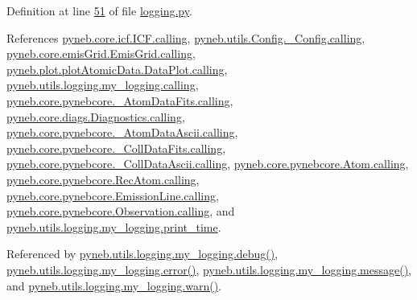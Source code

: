 Definition at line \hyperlink{logging_8py_source_l00051}{51} of file \hyperlink{logging_8py_source}{logging.\+py}.



References \hyperlink{icf_8py_source_l00016}{pyneb.\+core.\+icf.\+I\+C\+F.\+calling}, \hyperlink{_config_8py_source_l00032}{pyneb.\+utils.\+Config.\+\_\+\+Config.\+calling}, \hyperlink{emis_grid_8py_source_l00041}{pyneb.\+core.\+emis\+Grid.\+Emis\+Grid.\+calling}, \hyperlink{plot_atomic_data_8py_source_l00042}{pyneb.\+plot.\+plot\+Atomic\+Data.\+Data\+Plot.\+calling}, \hyperlink{logging_8py_source_l00044}{pyneb.\+utils.\+logging.\+my\+\_\+logging.\+calling}, \hyperlink{pynebcore_8py_source_l00090}{pyneb.\+core.\+pynebcore.\+\_\+\+Atom\+Data\+Fits.\+calling}, \hyperlink{diags_8py_source_l00169}{pyneb.\+core.\+diags.\+Diagnostics.\+calling}, \hyperlink{pynebcore_8py_source_l00311}{pyneb.\+core.\+pynebcore.\+\_\+\+Atom\+Data\+Ascii.\+calling}, \hyperlink{pynebcore_8py_source_l00568}{pyneb.\+core.\+pynebcore.\+\_\+\+Coll\+Data\+Fits.\+calling}, \hyperlink{pynebcore_8py_source_l00918}{pyneb.\+core.\+pynebcore.\+\_\+\+Coll\+Data\+Ascii.\+calling}, \hyperlink{pynebcore_8py_source_l01175}{pyneb.\+core.\+pynebcore.\+Atom.\+calling}, \hyperlink{pynebcore_8py_source_l02572}{pyneb.\+core.\+pynebcore.\+Rec\+Atom.\+calling}, \hyperlink{pynebcore_8py_source_l03263}{pyneb.\+core.\+pynebcore.\+Emission\+Line.\+calling}, \hyperlink{pynebcore_8py_source_l03419}{pyneb.\+core.\+pynebcore.\+Observation.\+calling}, and \hyperlink{logging_8py_source_l00047}{pyneb.\+utils.\+logging.\+my\+\_\+logging.\+print\+\_\+time}.



Referenced by \hyperlink{logging_8py_source_l00069}{pyneb.\+utils.\+logging.\+my\+\_\+logging.\+debug()}, \hyperlink{logging_8py_source_l00099}{pyneb.\+utils.\+logging.\+my\+\_\+logging.\+error()}, \hyperlink{logging_8py_source_l00079}{pyneb.\+utils.\+logging.\+my\+\_\+logging.\+message()}, and \hyperlink{logging_8py_source_l00089}{pyneb.\+utils.\+logging.\+my\+\_\+logging.\+warn()}.


